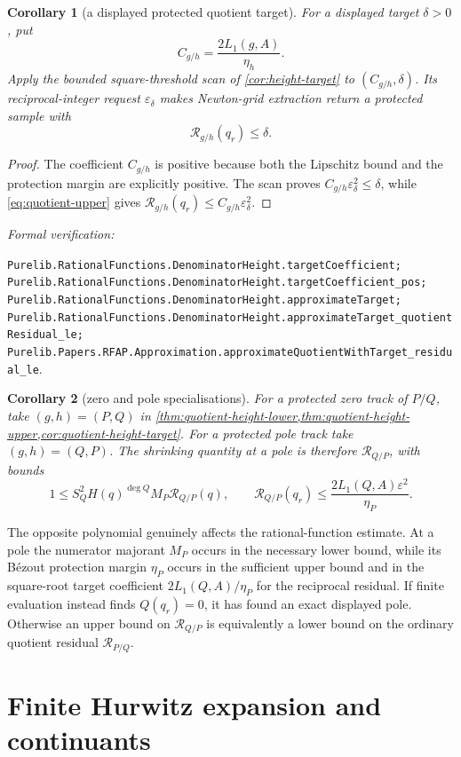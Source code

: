 \documentclass[11pt]{article}
\newtheorem{corollary}[corollary]{Corollary}
\newcommand{\eps}{\varepsilon}
\newcommand{\leanref}[1]{\par\smallskip\noindent
  \emph{Formal verification:}\par\nobreak
  {\raggedright\nolinkurl{#1}.\par}}
\begin{document}
\begin{corollary}[a displayed protected quotient target]
\label{cor:quotient-height-target}
For a displayed target $\delta>0$, put
\[
                  C_{g/h}=\frac{2L_1(g,A)}{\eta_h}.
\]
Apply the bounded square-threshold scan of
\cref{cor:height-target} to $(C_{g/h},\delta)$.  Its reciprocal-integer
request $\eps_\delta$ makes Newton-grid extraction return a protected sample
with
\[
                       \mathcal R_{g/h}(q_r)\le\delta.
\]
\end{corollary}

\begin{proof}
The coefficient $C_{g/h}$ is positive because both the Lipschitz bound and
the protection margin are explicitly positive.  The scan proves
$C_{g/h}\eps_\delta^2\le\delta$, while
\eqref{eq:quotient-upper} gives
$\mathcal R_{g/h}(q_r)\le C_{g/h}\eps_\delta^2$.
\end{proof}

\leanref{Purelib.RationalFunctions.DenominatorHeight.targetCoefficient;
Purelib.RationalFunctions.DenominatorHeight.targetCoefficient_pos;
Purelib.RationalFunctions.DenominatorHeight.approximateTarget;
Purelib.RationalFunctions.DenominatorHeight.approximateTarget_quotientResidual_le;
Purelib.Papers.RFAP.Approximation.approximateQuotientWithTarget_residual_le}

\begin{corollary}[zero and pole specialisations]
\label{thm:quotient-height}
For a protected zero track of $P/Q$, take $(g,h)=(P,Q)$ in
\cref{thm:quotient-height-lower,thm:quotient-height-upper,cor:quotient-height-target}.
For a protected pole track take
$(g,h)=(Q,P)$.  The shrinking quantity at a pole is therefore
$\mathcal R_{Q/P}$, with bounds
\[
 1\le S_Q^2H(q)^{\deg Q}M_P\mathcal R_{Q/P}(q),
 \qquad
 \mathcal R_{Q/P}(q_r)
 \le\frac{2L_1(Q,A)\eps^2}{\eta_P}.
\]
\end{corollary}

The opposite polynomial genuinely affects the rational-function estimate.
At a pole the numerator majorant $M_P$ occurs in the necessary lower bound,
while its B\'ezout protection margin $\eta_P$ occurs in the sufficient upper
bound and in the square-root target coefficient
$2L_1(Q,A)/\eta_P$ for the reciprocal residual.  If finite evaluation instead
finds $Q(q_r)=0$, it has found an exact displayed pole.  Otherwise an upper
bound on $\mathcal R_{Q/P}$ is equivalently a lower bound on the ordinary
quotient residual $\mathcal R_{P/Q}$.

\section{Finite Hurwitz expansion and continuants}
\label{sec:hurwitz-trace}
\end{document}
